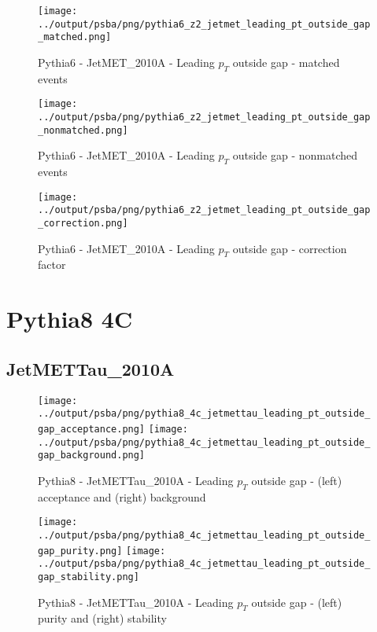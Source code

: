 \documentclass[11pt]{book}
\begin{document}
\begin{figure}[ht]
\centering
\texttt{[image: ../output/psba/png/pythia6\_z2\_jetmet\_leading\_pt\_outside\_gap\_matched.png]}
\caption{Pythia6 - JetMET\_2010A - Leading $p_{T}$ outside gap - matched events}
\label{fig:p6_jetmet_leading_pt_outside_gap_matched}
\end{figure}

\begin{figure}[ht]
\centering
\texttt{[image: ../output/psba/png/pythia6\_z2\_jetmet\_leading\_pt\_outside\_gap\_nonmatched.png]}
\caption{Pythia6 - JetMET\_2010A - Leading $p_{T}$ outside gap - nonmatched events}
\label{fig:p6_jetmet_leading_pt_outside_gap_nonmatched}
\end{figure}

\begin{figure}[ht]
\centering
\texttt{[image: ../output/psba/png/pythia6\_z2\_jetmet\_leading\_pt\_outside\_gap\_correction.png]}
\caption{Pythia6 - JetMET\_2010A - Leading $p_{T}$ outside gap - correction factor}
\label{fig:p6_jetmet_leading_pt_outside_gap_correction}
\end{figure}


\clearpage

\section{Pythia8 4C}
\subsection{JetMETTau\_2010A}
\begin{figure}[ht]
\centering
\texttt{[image: ../output/psba/png/pythia8\_4c\_jetmettau\_leading\_pt\_outside\_gap\_acceptance.png]}
\texttt{[image: ../output/psba/png/pythia8\_4c\_jetmettau\_leading\_pt\_outside\_gap\_background.png]}
\caption{Pythia8 - JetMETTau\_2010A - Leading $p_{T}$ outside gap - (left) acceptance and (right) background}
\label{fig:p8_jetmettau_leading_pt_outside_gap_ab}
\end{figure}

\begin{figure}[ht]
\centering
\texttt{[image: ../output/psba/png/pythia8\_4c\_jetmettau\_leading\_pt\_outside\_gap\_purity.png]}
\texttt{[image: ../output/psba/png/pythia8\_4c\_jetmettau\_leading\_pt\_outside\_gap\_stability.png]}
\caption{Pythia8 - JetMETTau\_2010A - Leading $p_{T}$ outside gap - (left) purity and (right) stability}
\label{fig:p8_jetmettau_leading_pt_outside_gap_ps}
\end{figure}
\end{document}

